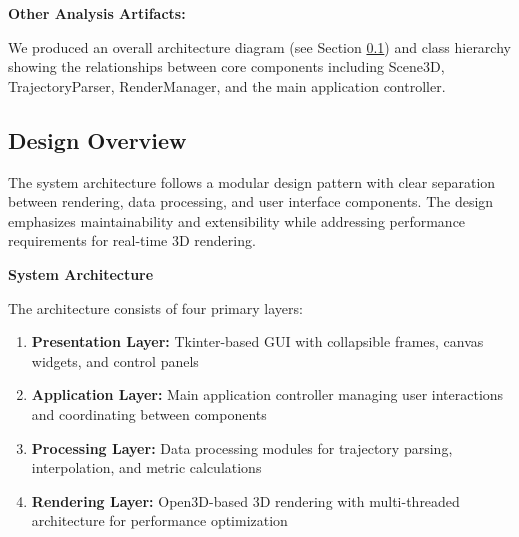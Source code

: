 \documentclass[11pt,a4paper]{article}
\begin{document}
\textbf{Other Analysis Artifacts:}

We produced an overall architecture diagram (see Section \ref{ss:design-overview}) and class hierarchy showing the relationships between core components including Scene3D, TrajectoryParser, RenderManager, and the main application controller.

\subsection{Design Overview}
\label{ss:design-overview}

The system architecture follows a modular design pattern with clear separation between rendering, data processing, and user interface components. The design emphasizes maintainability and extensibility while addressing performance requirements for real-time 3D rendering.

\textbf{System Architecture}

The architecture consists of four primary layers:

\begin{enumerate}
\item \textbf{Presentation Layer:} Tkinter-based GUI with collapsible frames, canvas widgets, and control panels
\item \textbf{Application Layer:} Main application controller managing user interactions and coordinating between components
\item \textbf{Processing Layer:} Data processing modules for trajectory parsing, interpolation, and metric calculations
\item \textbf{Rendering Layer:} Open3D-based 3D rendering with multi-threaded architecture for performance optimization
\end{enumerate}

\end{document}
